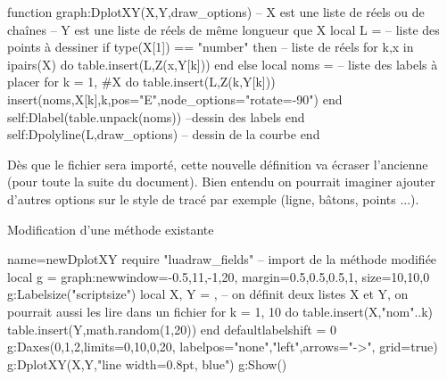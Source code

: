 \begin{Luacode}
function graph:DplotXY(X,Y,draw_options)
-- X est une liste de réels ou de chaînes
-- Y est une liste de réels de même longueur que X 
    local L = {} -- liste des points à dessiner
    if type(X[1]) == "number" then -- liste de réels
        for k,x in ipairs(X) do
            table.insert(L,Z(x,Y[k]))
        end
    else
        local noms = {} -- liste des labels à placer
        for k = 1, #X do
            table.insert(L,Z(k,Y[k]))
            insert(noms,{X[k],k,{pos="E",node_options="rotate=-90"}})
        end
        self:Dlabel(table.unpack(noms)) --dessin des labels
    end
    self:Dpolyline(L,draw_options) -- dessin de la courbe
end
\end{Luacode}

Dès que le fichier sera importé, cette nouvelle définition va écraser l'ancienne (pour toute la suite du document). Bien entendu on pourrait imaginer ajouter d'autres options sur le style de tracé par exemple (ligne, bâtons, points ...).

\begin{demo}{Modification d'une méthode existante}
\begin{luadraw}{name=newDplotXY}
require "luadraw_fields" -- import de la méthode modifiée
local g = graph:new{window={-0.5,11,-1,20}, margin={0.5,0.5,0.5,1}, size={10,10,0}}
g:Labelsize("scriptsize")
local X, Y = {}, {} -- on définit deux listes X et Y, on pourrait aussi les lire dans un fichier
for k = 1, 10 do
    table.insert(X,"nom"..k)
    table.insert(Y,math.random(1,20))
end
defaultlabelshift = 0
g:Daxes({0,1,2},{limits={{0,10},{0,20}}, labelpos={"none","left"},arrows="->", grid=true})
g:DplotXY(X,Y,"line width=0.8pt, blue")
g:Show()
\end{luadraw}
\end{demo}
